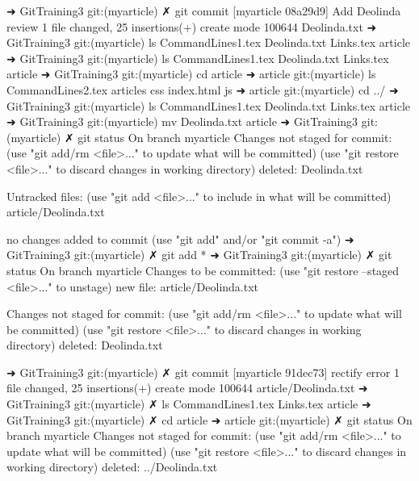 ➜  GitTraining3 git:(myarticle) ✗ git commit
[myarticle 08a29d9] Add Deolinda review
 1 file changed, 25 insertions(+)
 create mode 100644 Deolinda.txt
➜  GitTraining3 git:(myarticle) ls
CommandLines1.tex Deolinda.txt      Links.tex         article
➜  GitTraining3 git:(myarticle) ls                            
CommandLines1.tex Deolinda.txt      Links.tex         article
➜  GitTraining3 git:(myarticle) cd article 
➜  article git:(myarticle) ls
CommandLines2.tex articles          css               index.html        js
➜  article git:(myarticle) cd ../
➜  GitTraining3 git:(myarticle) ls
CommandLines1.tex Deolinda.txt      Links.tex         article
➜  GitTraining3 git:(myarticle) mv Deolinda.txt article 
➜  GitTraining3 git:(myarticle) ✗ git status
On branch myarticle
Changes not staged for commit:
  (use "git add/rm <file>..." to update what will be committed)
  (use "git restore <file>..." to discard changes in working directory)
	deleted:    Deolinda.txt

Untracked files:
  (use "git add <file>..." to include in what will be committed)
	article/Deolinda.txt

no changes added to commit (use "git add" and/or "git commit -a")
➜  GitTraining3 git:(myarticle) ✗ git add * 
➜  GitTraining3 git:(myarticle) ✗ git status
On branch myarticle
Changes to be committed:
  (use "git restore --staged <file>..." to unstage)
	new file:   article/Deolinda.txt

Changes not staged for commit:
  (use "git add/rm <file>..." to update what will be committed)
  (use "git restore <file>..." to discard changes in working directory)
	deleted:    Deolinda.txt

➜  GitTraining3 git:(myarticle) ✗ git commit
[myarticle 91dec73] rectify error
 1 file changed, 25 insertions(+)
 create mode 100644 article/Deolinda.txt
➜  GitTraining3 git:(myarticle) ✗ ls
CommandLines1.tex Links.tex         article
➜  GitTraining3 git:(myarticle) ✗ cd article 
➜  article git:(myarticle) ✗ git status
On branch myarticle
Changes not staged for commit:
  (use "git add/rm <file>..." to update what will be committed)
  (use "git restore <file>..." to discard changes in working directory)
	deleted:    ../Deolinda.txt

